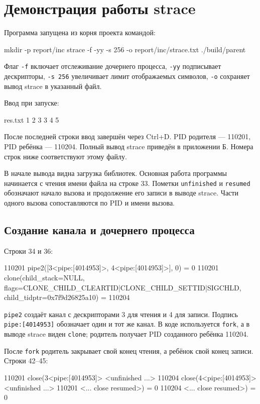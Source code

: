 \documentclass[12pt,a4paper]{article}
\begin{document}
\section{Демонстрация работы strace}
Программа запущена из корня проекта командой:
\begin{terminal}
mkdir -p report/inc
strace -f -yy -s 256 -o report/inc/strace.txt ./build/parent
\end{terminal}

Флаг \texttt{-f} включает отслеживание дочернего процесса, \texttt{-yy} подписывает дескрипторы, \texttt{-s 256} увеличивает лимит отображаемых символов, \texttt{-o} сохраняет вывод strace в указанный файл.

Ввод при запуске:
\begin{terminal}
res.txt
1 2 3
3 4
5
\end{terminal}

После последней строки ввод завершён через Ctrl+D. PID родителя --- 110201, PID ребёнка --- 110204. Полный вывод strace приведён в приложении Б. Номера строк ниже соответствуют этому файлу.

В начале вывода видна загрузка библиотек. Основная работа программы начинается с чтения имени файла на строке 33. Пометки \texttt{unfinished} и \texttt{resumed} обозначают начало вызова и продолжение его записи в выводе strace. Части одного вызова сопоставляются по PID и имени вызова.

\subsection{Создание канала и дочернего процесса}
Строки 34 и 36:
\begin{terminal}
110201 pipe2([3<pipe:[4014953]>, 4<pipe:[4014953]>], 0) = 0
110201 clone(child_stack=NULL, flags=CLONE_CHILD_CLEARTID|CLONE_CHILD_SETTID|SIGCHLD, child_tidptr=0x7f9d26825a10) = 110204
\end{terminal}

\texttt{pipe2} создаёт канал с дескрипторами 3 для чтения и 4 для записи. Подпись \texttt{pipe:[4014953]} обозначает один и тот же канал. В коде используется \texttt{fork}, а в выводе strace виден \texttt{clone}; родитель получает PID созданного ребёнка 110204.

После \texttt{fork} родитель закрывает свой конец чтения, а ребёнок свой конец записи. Строки 42--45:
\begin{terminal}
110201 close(3<pipe:[4014953]> <unfinished ...>
110204 close(4<pipe:[4014953]> <unfinished ...>
110201 <... close resumed>)             = 0
110204 <... close resumed>)             = 0
\end{terminal}
\end{document}
